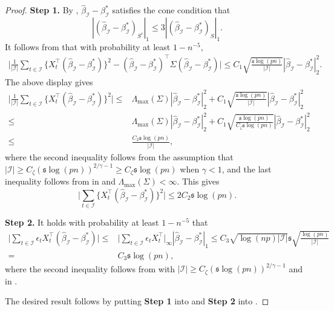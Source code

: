 \documentclass[11pt]{article}
\newcommand{\I}{{\mathcal I }}
\newcommand{\s}{ { \mathfrak{s}  } }
\theoremstyle{plain}
\theoremstyle{definition}
\begin{document}
\begin{proof}
{\bf Step 1.} By ,   $\widehat \beta_\I  -    \beta^*_\I  $ satisfies the cone condition that 
$$  | (\widehat \beta_\I  -    \beta^*_\I  )_{S^c} |_1 \le 3  | (\widehat \beta_\I  -    \beta^*_\I )_S   |_1   .$$
It follows from  that with probability at least $ 1-n^{-5}$,
\begin{align*} 
 \bigg| \frac{1}{|\I| } \sum_{ t \in \I } \big\{  X_t^\top  ( \widehat \beta_\I  -    \beta^*_\I  )   \big\} ^2    - ( \widehat \beta_\I  -    \beta^*_\I    )^\top \Sigma  ( \widehat \beta_\I  -    \beta^*_\I  )  \bigg|  \le C_1  \sqrt { \frac{\s \log(pn) }{|\I| }} | \widehat \beta_\I  -    \beta^*_\I     |_2 ^2  .
\end{align*}
The above display   gives
\begin{align*}    \bigg| \frac{1}{|\I| } \sum_{t \in \I } \big\{  X_t^\top  ( \widehat \beta_\I  -    \beta^*_\I  )    \big\}^2 \bigg| \le &  \Lambda_{\max}(\Sigma)   | \widehat \beta_\I  -    \beta^*_\I     |_2 ^2   + C_1  \sqrt { \frac{\s \log(pn) }{|\I| }} | \widehat \beta_\I  -    \beta^*_\I     |_2 ^2 
\\
\le & \Lambda_{\max}(\Sigma)  | \widehat \beta_\I  -    \beta^*_\I     |_2 ^2 + C_1  \sqrt { \frac{\s \log(pn) }{C_\zeta\s \log(pn)  }} | \widehat \beta_\I  -    \beta^*_\I     |_2 ^2   
\\
\le &  \frac{ C_2\s\log(pn)}{|\I| }  , \end{align*} 
where the second inequality follows from the assumption that  $|\I| \ge  C_\zeta ( \s \log(pn) )^{2/\gamma -1 } \ge C_\zeta\s \log(pn) $ when $ \gamma < 1$, and the last inequality follows from    in  and $\Lambda_{\max}(\Sigma) < \infty$.
This gives 
$$    \bigg|   \sum_{t \in \I } \big\{  X_t^\top  ( \widehat \beta_\I  -    \beta^*_\I  )    \big\}^2 \bigg| \le  2 C_2\s\log(pn) . $$

{\bf Step 2.} It holds with probability at least $ 1-n^{-5}$ that
\begin{align*}  \nonumber  \bigg|\sum_{ t  \in \I   } \epsilon_t   X_t ^\top (  \widehat \beta _\I  -  \beta^* _{\I  }) \bigg|
\le 
&
       \bigg| \sum_{ t  \in \I   } \epsilon_t   X_t ^\top \bigg| _\infty  |   \widehat \beta _\I  -  \beta^* _{\I  } | _1 \le C_3   \sqrt { \log(np)    |\I | }  \s\sqrt {  \frac{\log(p n )} {|\I|  } } 
      \\
=  &  C_3    \s \log(pn),
\end{align*}
where the second inequality follows from  with $|\I| \ge  C_\zeta ( \s \log(pn) )^{2/\gamma -1 }$ and    in .

 The desired result follows by putting {\bf Step 1} into  and {\bf Step 2} into .
\end{proof} 
\end{document}

